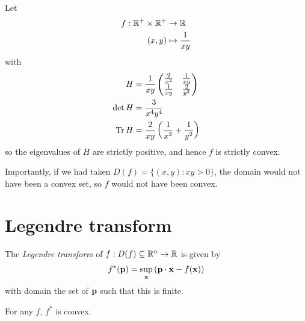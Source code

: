 \documentclass{../template/note}
\begin{document}
    \begin{example*}
        Let
        \begin{align*}
            f: \mathbb R^+ \times \mathbb R^+ &\to \mathbb R \\
            (x, y) &\mapsto \frac 1 {xy}
        \end{align*}
        with
        \begin{align*}
            H &= \frac 1 {xy} \begin{pmatrix}
                \frac 2 {x^2} & \frac 1 {xy} \\
                \frac 1 {xy} & \frac 2 {y^2} \\
            \end{pmatrix} \\
            \det H &= \frac 3 {x^4y^4} \\
            \operatorname{Tr} H &= \frac 2 {xy} \left(\frac 1 {x^2} + \frac 1 {y^2}\right)
        \end{align*}
        so the eigenvalues of $H$ are strictly positive, and hence $f$ is strictly convex.
        
        Importantly, if we had taken $D(f) = \{(x, y): xy > 0\}$, the domain would not have been a convex set, so $f$ would not have been convex.
    \end{example*}
    
    \section{Legendre transform}

    \begin{definition*}
        The \emph{Legendre transform} of $f: D(f) \subseteq \mathbb R^n \to \mathbb R$ is given by
        \begin{align*}
            f^*(\V p) = \sup_{\V x} \left(\V p \cdot \V x - f(\V x)\right)
        \end{align*}
        with domain the set of $\V p$ such that this is finite.        
    \end{definition*}
    
    \begin{lemma}
        For any $f$, $f^*$ is convex.
    \end{lemma}
    
\end{document}
